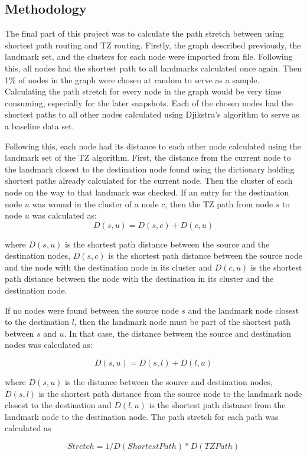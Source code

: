 \documentclass{mpaper}
\begin{document}
\subsection{Methodology}
The final part of this project was to calculate the path stretch between using shortest path routing and TZ routing. Firstly, the graph described previously, the landmark set, and the clusters for each node were imported from file. Following this, all nodes had the shortest path to all landmarks calculated once again. Then 1\% of nodes in the graph were chosen at random to serve as a sample. Calculating the path stretch for every node in the graph would be very time consuming, especially for the later snapshots. Each of the chosen nodes had the shortest paths to all other nodes calculated using Djikstra's algorithm to serve as a baseline data set. 

Following this, each node had its distance to each other node calculated using the landmark set of the TZ algorithm. First, the distance from the current node to the landmark closest to the destination node found using the dictionary holding shortest paths already calculated for the current node. Then the cluster of each node on the way to that landmark was checked. If an entry for the destination node $u$ was wound in the cluster of a node $c$, then the TZ path from node $s$ to node $u$ was calculated as:
\[ D(s,u) = D(s,c) + D(c,u)\]

where $D(s,u)$ is the shortest path distance between the source and the destination nodes, $D(s,c)$ is the shortest path distance between the source node and the node with the destination node in its cluster and $D(c,u)$ is the shortest path distance between the node with the destination in its cluster and the destination node.

If no nodes were found between the source node $s$ and the landmark node closest to the destination $l$, then the landmark node must be part of the shortest path between $s$ and $u$. In that case, the distance between the source and destination nodes was calculated as:

\[ D(s,u) = D(s,l) + D(l,u)\]

where $D(s,u)$ is the distance between the source and destination nodes, $D(s,l)$ is the shortest path distance from the source node to the landmark node closest to the destination and $D(l,u)$ is the shortest path distance from the landmark node to the destination node. The path stretch for each path was calculated as 

\[ Stretch = 1 / D(Shortest Path) * D(TZ Path)\]
\end{document}
